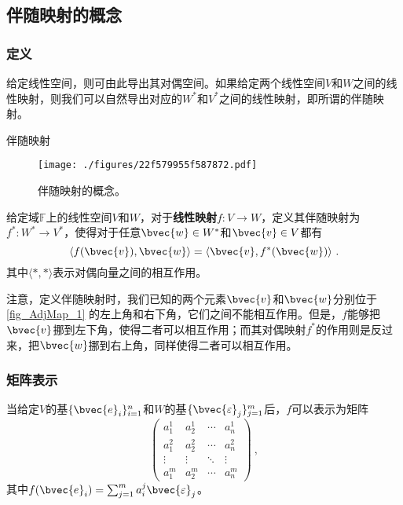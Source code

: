 



\subsection{伴随映射的概念}


\subsubsection{定义}

给定线性空间，则可由此导出其对偶空间。如果给定两个线性空间$V$和$W$之间的线性映射，则我们可以自然导出对应的$W^*$和$V^*$之间的线性映射，即所谓的伴随映射。



\begin{definition}{伴随映射}

\begin{figure}[ht]
\centering
\texttt{[image: ./figures/22f579955f587872.pdf]}
\caption{伴随映射的概念。} \label{fig_AdjMap_1}
\end{figure}

给定域$\mathbb{F}$上的线性空间$V$和$W$，对于\textbf{线性映射}$f:V\to W$，定义其伴随映射为$f^*:W^*\to V^*$，使得对于任意$\bvec{w}\in W^*$和$\bvec{v}\in V$都有
\begin{equation}
\langle f(\bvec{v}), \bvec{w} \rangle = \langle \bvec{v}, f^*(\bvec{w}) \rangle~. 
\end{equation}
其中$\langle *, * \rangle$表示对偶向量之间的相互作用。
\end{definition}

注意，定义伴随映射时，我们已知的两个元素$\bvec{v}$和$\bvec{w}$分别位于\autoref{fig_AdjMap_1} 的左上角和右下角，它们之间不能相互作用。但是，$f$能够把$\bvec{v}$挪到左下角，使得二者可以相互作用；而其对偶映射$f^*$的作用则是反过来，把$\bvec{w}$挪到右上角，同样使得二者可以相互作用。



\subsubsection{矩阵表示}


当给定$V$的基$\{\bvec{e}_i\}_{i=1}^n$和$W$的基$\{\bvec{\varepsilon}_j\}_{j=1}^m$后，$f$可以表示为矩阵
\begin{equation}
\begin{pmatrix}
a^1_1&a^1_2&\cdots&a^1_n\\
a^2_1&a^2_2&\cdots&a^2_n\\
\vdots&\vdots&\ddots&\vdots\\
a^m_1&a^m_2&\cdots&a^m_n
\end{pmatrix}~, 
\end{equation}
其中$f(\bvec{e}_i)=\sum_{j=1}^m a^j_i\bvec{\varepsilon}_j$。

